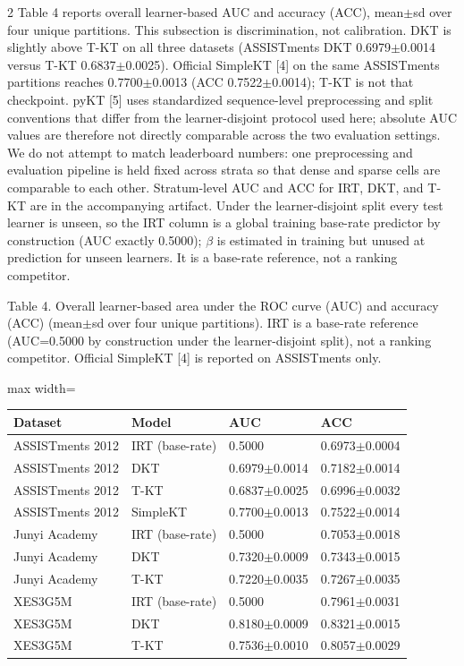 \documentclass[10pt,a4paper]{article}
\begin{document}
\begin{multicols}{2}
 Table 4 reports overall learner-based AUC and accuracy (ACC), mean$\pm$sd over four unique partitions. This subsection is discrimination, not calibration. DKT is slightly above T-KT on all three datasets (ASSISTments DKT 0.6979$\pm$0.0014 versus T-KT 0.6837$\pm$0.0025). Official SimpleKT [4] on the same ASSISTments partitions reaches 0.7700$\pm$0.0013 (ACC 0.7522$\pm$0.0014); T-KT is not that checkpoint. pyKT [5] uses standardized sequence-level preprocessing and split conventions that differ from the learner-disjoint protocol used here; absolute AUC values are therefore not directly comparable across the two evaluation settings. We do not attempt to match leaderboard numbers: one preprocessing and evaluation pipeline is held fixed across strata so that dense and sparse cells are comparable to each other. Stratum-level AUC and ACC for IRT, DKT, and T-KT are in the accompanying artifact. Under the learner-disjoint split every test learner is unseen, so the IRT column is a global training base-rate predictor by construction (AUC exactly 0.5000); $\beta$ is estimated in training but unused at prediction for unseen learners. It is a base-rate reference, not a ranking competitor.


\end{multicols}
\noindent\begin{minipage}{\textwidth}
\centering
{\fontsize{8}{9.5}\selectfont Table 4. Overall learner-based area under the ROC curve (AUC) and accuracy (ACC) (mean$\pm$sd over four unique partitions). IRT is a base-rate reference (AUC=0.5000 by construction under the learner-disjoint split), not a ranking competitor. Official SimpleKT [4] is reported on ASSISTments only.\par}
\vspace{0.35em}
\begin{adjustbox}{max width=\textwidth}
{\small
\begin{tabular}{@{}llll@{}}
\toprule
Dataset & Model & AUC & ACC \\
\midrule
ASSISTments 2012 & IRT (base-rate) & 0.5000 & 0.6973$\pm$0.0004 \\
ASSISTments 2012 & DKT & 0.6979$\pm$0.0014 & 0.7182$\pm$0.0014 \\
ASSISTments 2012 & T-KT & 0.6837$\pm$0.0025 & 0.6996$\pm$0.0032 \\
ASSISTments 2012 & SimpleKT & 0.7700$\pm$0.0013 & 0.7522$\pm$0.0014 \\
Junyi Academy & IRT (base-rate) & 0.5000 & 0.7053$\pm$0.0018 \\
Junyi Academy & DKT & 0.7320$\pm$0.0009 & 0.7343$\pm$0.0015 \\
Junyi Academy & T-KT & 0.7220$\pm$0.0035 & 0.7267$\pm$0.0035 \\
XES3G5M & IRT (base-rate) & 0.5000 & 0.7961$\pm$0.0031 \\
XES3G5M & DKT & 0.8180$\pm$0.0009 & 0.8321$\pm$0.0015 \\
XES3G5M & T-KT & 0.7536$\pm$0.0010 & 0.8057$\pm$0.0029 \\
\bottomrule
\end{tabular}}
\end{adjustbox}
\end{minipage}
\end{document}
